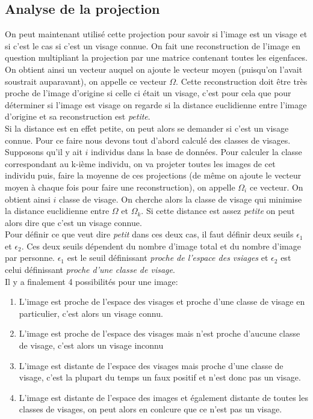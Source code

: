 \documentclass[12pt,french]{article}
\theoremstyle{plain}
\theoremstyle{definition}
\begin{document}
\subsection{Analyse de la projection}
On peut maintenant utilisé cette projection pour savoir si l'image est un visage et si c'est le cas si c'est un visage connue.
On fait une reconstruction de l'image en question multipliant la projection par une matrice contenant toutes les eigenfaces. On obtient ainsi un vecteur auquel on ajoute le vecteur moyen (puisqu'on l'avait soustrait auparavant), on appelle ce vecteur $\Omega$.
Cette reconstruction doit être très proche de l'image d'origine si celle ci était un visage, c'est pour cela que pour déterminer si l'image est visage on regarde si la distance euclidienne entre l'image d'origine et sa reconstruction est \emph{petite}.\\
Si la distance est en effet petite, on peut alors se demander si c'est un visage connue. Pour ce faire nous devons tout d'abord calculé des classes de visages.\\
Supposons qu'il y ait $i$ individus dans la base de données. Pour calculer la classe correspondant au k-ième individu, on va projeter toutes les images de cet individu puis, faire la moyenne de ces projections (de même on ajoute le vecteur moyen à chaque fois pour faire une reconstruction), on appelle $\Omega_i$ ce vecteur. On obtient ainsi $i$ classe de visage. On cherche alors la classe de visage qui minimise la distance euclidienne entre $\Omega$ et $\Omega_k$. Si cette distance est assez \emph{petite} on peut alors dire que c'est un visage connue. \\
Pour définir ce que veut dire \emph{petit} dans ces deux cas, il faut définir deux seuils $\epsilon_1$ et $\epsilon_2$. Ces deux seuils dépendent du nombre d'image total et du nombre d'image par personne. $\epsilon_1$ est le seuil définissant \emph{proche de l'espace des vsiages} et $\epsilon_2$ est celui définissant \emph{proche d'une classe de visage}.\\

Il y a finalement 4 possibilités pour une image:
\begin{enumerate}
  \item L'image est proche de l'espace des visages et proche d'une classe de visage en particulier, c'est alors un visage connu.
  \item L'image est proche de l'espace des visages mais n'est proche d'aucune classe de visage, c'est alors un visage inconnu
  \item L'image est distante de l'espace des visages mais proche d'une classe de visage, c'est la plupart du temps un faux positif et n'est donc pas un visage.
  \item L'image est distante de l'espace des images et également distante de toutes les classes de visages, on peut alors en conlcure que ce n'est pas un visage.
\end{enumerate}
\end{document}
